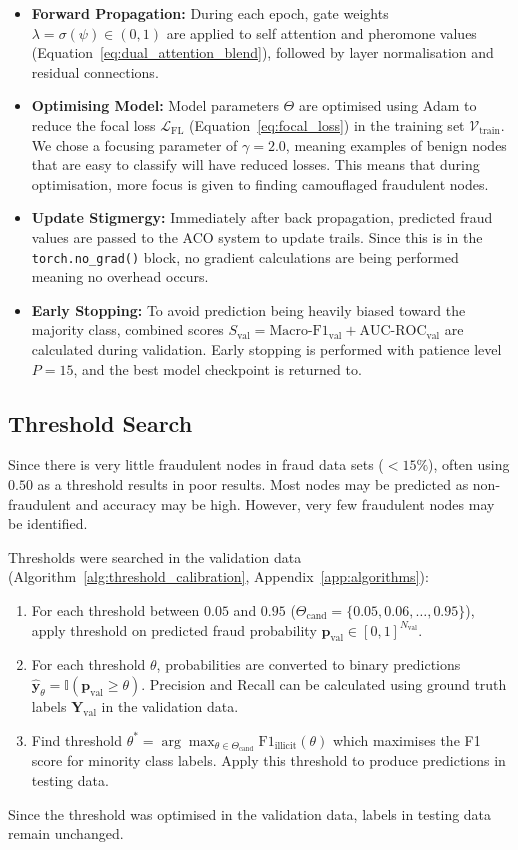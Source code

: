 \begin{itemize}
    \item \textbf{Forward Propagation:} During each epoch, gate weights $\lambda = \sigma(\psi) \in (0, 1)$ are applied to self attention and pheromone values (Equation~\ref{eq:dual_attention_blend}), followed by layer normalisation and residual connections.
    \item \textbf{Optimising Model:} Model parameters $\Theta$ are optimised using Adam to reduce the focal loss $\mathcal{L}_{\text{FL}}$ (Equation~\ref{eq:focal_loss}) in the training set $\mathcal{V}_{\text{train}}$. We chose a focusing parameter of $\gamma = 2.0$, meaning examples of benign nodes that are easy to classify will have reduced losses. This means that during optimisation, more focus is given to finding camouflaged fraudulent nodes.
    \item \textbf{Update Stigmergy:} Immediately after back propagation, predicted fraud values are passed to the ACO system to update trails. Since this is in the \texttt{torch.no\_grad()} block, no gradient calculations are being performed meaning no overhead occurs.
    \item \textbf{Early Stopping:} To avoid prediction being heavily biased toward the majority class, combined scores $S_{\text{val}} = \text{Macro-F1}_{\text{val}} + \text{AUC-ROC}_{\text{val}}$ are calculated during validation. Early stopping is performed with patience level $P=15$, and the best model checkpoint is returned to.
\end{itemize}

\subsection{Threshold Search}
Since there is very little fraudulent nodes in fraud data sets ($<15\%$), often using $0.50$ as a threshold results in poor results. Most nodes may be predicted as non-fraudulent and accuracy may be high. However, very few fraudulent nodes may be identified.

Thresholds were searched in the validation data (Algorithm~\ref{alg:threshold_calibration}, Appendix~\ref{app:algorithms}):
\begin{enumerate}
    \item For each threshold between $0.05$ and $0.95$ ($\Theta_{\text{cand}} = \{0.05, 0.06, \dots, 0.95\}$), apply threshold on predicted fraud probability $\mathbf{p}_{\text{val}} \in [0, 1]^{N_{\text{val}}}$.
    \item For each threshold $\theta$, probabilities are converted to binary predictions $\hat{\mathbf{y}}_\theta = \mathbb{I}(\mathbf{p}_{\text{val}} \ge \theta)$. Precision and Recall can be calculated using ground truth labels $\mathbf{Y}_{\text{val}}$ in the validation data.
    \item Find threshold $\theta^* = \arg\max_{\theta \in \Theta_{\text{cand}}} \text{F1}_{\text{illicit}}(\theta)$ which maximises the F1 score for minority class labels. Apply this threshold to produce predictions in testing data.
\end{enumerate}
Since the threshold was optimised in the validation data, labels in testing data remain unchanged.

